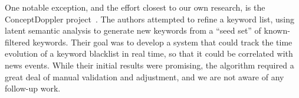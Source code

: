 One notable exception, and the effort closest to our own research, is
the ConceptDoppler project~\cite{crandall2007.conceptdoppler}.  The
authors attempted to refine a keyword list, using latent semantic
analysis to generate new keywords from a “seed set” of
known-filtered keywords.  Their goal was to develop a system that
could track the time evolution of a keyword blacklist in real time, so
that it could be correlated with news events.  While their initial
results were promising, the algorithm required a great deal of manual
validation and adjustment, and we are not aware of any follow-up work.
